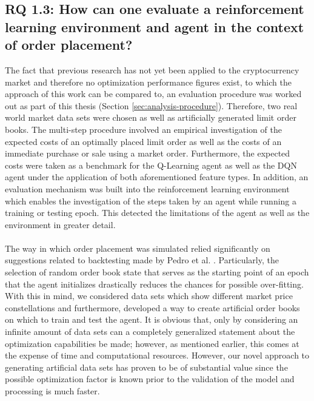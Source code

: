 \subsection{RQ 1.3: How can one evaluate a reinforcement learning environment and agent in the context of order placement?}

    The fact that previous research has not yet been applied to the cryptocurrency market and therefore no optimization performance figures exist, to which the approach of this work can be compared to, an evaluation procedure was worked out as part of this thesis (Section \ref{sec:analysis-procedure}).
    Therefore, two real world market data sets were chosen as well as artificially generated limit order books.
    The multi-step procedure involved an empirical investigation of the expected costs of an optimally placed limit order as well as the costs of an immediate purchase or sale using a market order.
    Furthermore, the expected costs were taken as a benchmark for the Q-Learning agent as well as the DQN agent under the application of both aforementioned feature types.
    In addition, an evaluation mechanism was built into the reinforcement learning environment which enables the investigation of the steps taken by an agent while running a training or testing epoch.
    This detected the limitations of the agent as well as the environment in greater detail.
    \\
    \\
    The way in which order placement was simulated relied significantly on suggestions related to backtesting made by Pedro et al. \cite{de2018advances}.
    Particularly, the selection of random order book state that serves as the starting point of an epoch that the agent initializes drastically reduces the chances for possible over-fitting.
    With this in mind, we considered data sets which show different market price constellations and furthermore, developed a way to create artificial order books on which to train and test the agent.
    It is obvious that, only by considering an infinite amount of data sets can a completely generalized statement about the optimization capabilities be made; however, as mentioned earlier, this comes at the expense of time and computational resources.
    However, our novel approach to generating artificial data sets has proven to be of substantial value since the possible optimization factor is known prior to the validation of the model and processing is much faster.
    
